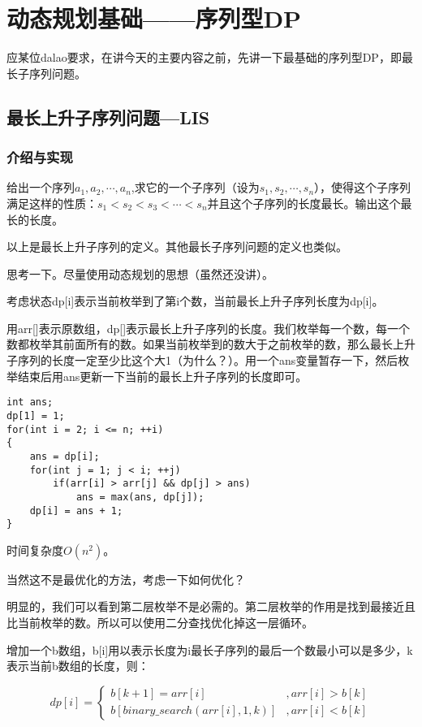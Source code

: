 \section{动态规划基础------序列型DP}
应某位dalao要求，在讲今天的主要内容之前，先讲一下最基础的序列型DP，即最长子序列问题。
\subsection{最长上升子序列问题---LIS}
\subsubsection{介绍与实现}
\begin{definition}[最长上升子序列]
	给出一个序列$a_1, a_2, \cdots, a_n$,求它的一个子序列（设为$s_1, s_2, \cdots, s_n$），使得这个子序列满足这样的性质：$s_1<s_2<s_3<\cdots<s_n$并且这个子序列的长度最长。输出这个最长的长度。
\end{definition}

以上是最长上升子序列的定义。其他最长子序列问题的定义也类似。

思考一下。尽量使用动态规划的思想（虽然还没讲）。

考虑状态dp[i]表示当前枚举到了第i个数，当前最长上升子序列长度为dp[i]。

用arr[]表示原数组，dp[]表示最长上升子序列的长度。我们枚举每一个数，每一个数都枚举其前面所有的数。如果当前枚举到的数大于之前枚举的数，那么最长上升子序列的长度一定至少比这个大1（为什么？）。用一个ans变量暂存一下，然后枚举结束后用ans更新一下当前的最长上升子序列的长度即可。
\begin{verbatim}
int ans;  
dp[1] = 1;  
for(int i = 2; i <= n; ++i)  
{
    ans = dp[i];  
    for(int j = 1; j < i; ++j)
        if(arr[i] > arr[j] && dp[j] > ans)  
            ans = max(ans, dp[j]);  
    dp[i] = ans + 1;
}
\end{verbatim}

时间复杂度$O(n^2)$。

当然这不是最优化的方法，考虑一下如何优化？

明显的，我们可以看到第二层枚举不是必需的。第二层枚举的作用是找到最接近且比当前枚举的数。所以可以使用二分查找优化掉这一层循环。

增加一个b数组，b[i]用以表示长度为i最长子序列的最后一个数最小可以是多少，k表示当前b数组的长度，则：

\begin{equation*}
	dp[i]=\begin{cases}
		b[k+1]=arr[i]                  & , arr[i]>b[k] \\
		b[binary\_search(arr[i],1,k)] & , arr[i]<b[k]
	\end{cases}
\end{equation*}

